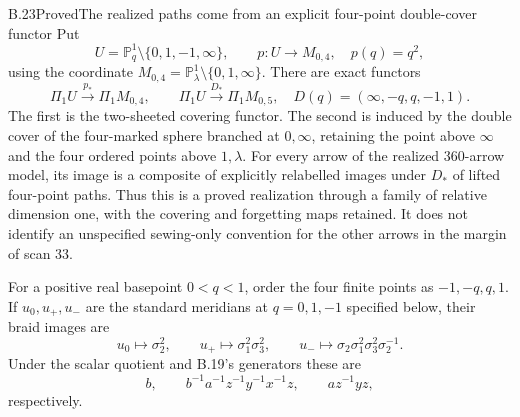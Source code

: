 \begin{result}{B.23}{Proved}{The realized paths come from an explicit four-point double-cover functor}
Put
\[
 U=\mathbb P^1_q\setminus\{0,1,-1,\infty\},\qquad
 p:U\longrightarrow M_{0,4},\quad p(q)=q^2,
\]
using the coordinate $M_{0,4}=\mathbb P^1_\lambda
\setminus\{0,1,\infty\}$.  There are exact functors
\[
 \Pi_1U\xrightarrow{p_*}\Pi_1M_{0,4},\qquad
 \Pi_1U\xrightarrow{D_*}\Pi_1M_{0,5},\quad
 D(q)=(\infty,-q,q,-1,1).                         \tag{B.51}
\]
The first is the two-sheeted covering functor.  The second
is induced by the double cover of the four-marked sphere
branched at $0,\infty$, retaining the point above $\infty$
and the four ordered points above $1,\lambda$.
For every arrow of the realized $360$-arrow model, its
image is a composite of explicitly relabelled images
under $D_*$ of lifted four-point paths.  Thus this is a
proved realization through a family of relative dimension
one, with the covering and forgetting maps retained.
It does not identify an unspecified sewing-only convention
for the other arrows in the margin of scan 33.

For a positive real basepoint $0<q<1$, order the four
finite points as $-1,-q,q,1$.  If $u_0,u_+,u_-$ are the
standard meridians at $q=0,1,-1$ specified below, their
braid images are
\[
 u_0\longmapsto\sigma_2^2,\qquad
 u_+\longmapsto\sigma_1^2\sigma_3^2,\qquad
 u_-\longmapsto\sigma_2\sigma_1^2\sigma_3^2\sigma_2^{-1}.
                                                               \tag{B.52}
\]
Under the scalar quotient and B.19's generators these are
\[
 b,\qquad b^{-1}a^{-1}z^{-1}y^{-1}x^{-1}z,
 \qquad az^{-1}yz,                                  \tag{B.53}
\]
respectively.
\end{result}
